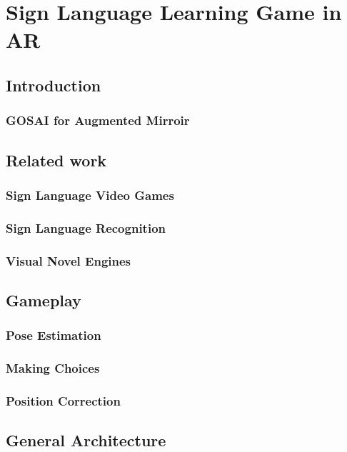 \chapter{Sign Language Learning Game in AR}

\section{Introduction}

\subsection{GOSAI for Augmented Mirroir}

\section{Related work}

\subsection{Sign Language Video Games}
\subsection{Sign Language Recognition}
\subsection{Visual Novel Engines}

\section{Gameplay}

\subsection{Pose Estimation}
\subsection{Making Choices}
\subsection{Position Correction}

\section{General Architecture}

